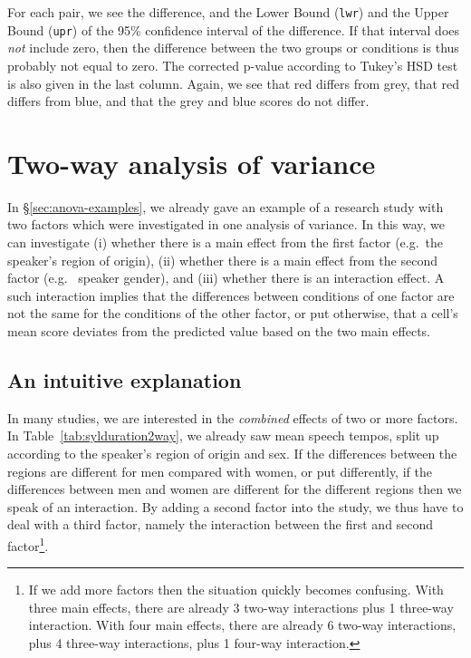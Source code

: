 \documentclass[
]{book}
\begin{document}
For each pair, we see the difference, and the Lower Bound (\texttt{lwr}) and
the Upper Bound (\texttt{upr}) of the 95\% confidence interval
of the difference. If that interval does \emph{not} include zero, then
the difference between the two groups or conditions is thus probably not
equal to zero. The corrected p-value according to
Tukey's HSD test is also given in the last column.
Again, we see that red differs from grey, that red differs from
blue, and that the grey and blue scores do not differ.

\hypertarget{two-way-analysis-of-variance}{%
\section{Two-way analysis of variance}\label{two-way-analysis-of-variance}}

In §\ref{sec:anova-examples}, we already gave an example
of a research study with two factors which were investigated in one analysis
of variance. In this way, we can investigate (i) whether there is a
main effect from the first factor (e.g.~the speaker's region of origin),
(ii) whether there is a main effect from the second factor (e.g.~
speaker gender), and (iii) whether there is an interaction effect.
A such interaction implies that the differences between conditions of
one factor are not the same
for the conditions of the other factor, or put otherwise, that a cell's mean
score deviates from the predicted value based on the two main effects.

\hypertarget{an-intuitive-explanation}{%
\subsection{An intuitive explanation}\label{an-intuitive-explanation}}

In many studies, we are interested in the \emph{combined} effects
of two or more factors. In
Table~\ref{tab:sylduration2way}, we already saw mean speech tempos,
split up according to the speaker's region of origin and sex.
If the differences between the regions are different for men compared with
women, or put differently, if the differences between men and women are
different for the different regions then we speak of an interaction. By adding
a second factor into the study, we thus have to deal with a third factor,
namely the interaction between the first and second factor\footnote{If we add more factors then the situation quickly becomes confusing.
  With three main effects, there are already 3 two-way interactions plus 1 three-way
  interaction. With four main effects, there are already 6 two-way interactions, plus
  4 three-way interactions, plus 1 four-way interaction.}.
\end{document}
